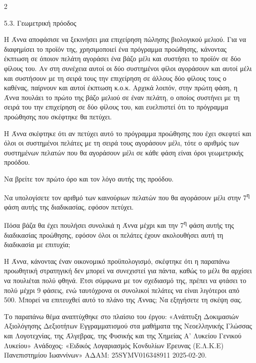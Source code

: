 \begin{ylh}{2}
    \item 5.3. Γεωμετρική πρόοδος
\end{ylh}
Η Άννα αποφάσισε να ξεκινήσει μια επιχείρηση πώλησης βιολογικού μελιού. Για να διαφημίσει το προϊόν της, χρησιμοποιεί ένα πρόγραμμα προώθησης, κάνοντας έκπτωση σε όποιον πελάτη αγοράσει ένα βάζο μέλι και συστήσει το προϊόν σε δύο φίλους του. Αν στη συνέχεια αυτοί οι δύο συστημένοι φίλοι αγοράσουν και αυτοί μέλι και συστήσουν με τη σειρά τους την επιχείρηση σε άλλους δύο φίλους τους ο καθένας, παίρνουν και αυτοί έκπτωση κ.ο.κ. Αρχικά λοιπόν, στην πρώτη φάση, η Άννα πουλάει το πρώτο της βάζο μελιού σε έναν πελάτη, ο οποίος συστήνει με τη σειρά του την επιχείρηση σε δύο φίλους του, και ευελπιστεί ότι το πρόγραμμα προώθησης που σκέφτηκε θα πετύχει.

\begin{alist}
\item Η Άννα σκέφτηκε ότι αν πετύχει αυτό το πρόγραμμα προώθησης που έχει σκεφτεί και όλοι οι συστημένοι πελάτες με τη σειρά τους αγοράσουν μέλι, τότε ο αριθμός των συστημένων πελατών που θα αγοράσουν μέλι σε κάθε φάση είναι όροι γεωμετρικής προόδου.

\begin{rlist}
\item
  Να βρείτε τον πρώτο όρο και τον λόγο αυτής της προόδου.

\item
  Να υπολογίσετε τον αριθμό των καινούριων πελατών που θα αγοράσουν μέλι στην 7\textsuperscript{η} φάση αυτής της διαδικασίας, εφόσον πετύχει.

\item
  Πόσα βάζα θα έχει πουλήσει συνολικά η Άννα μέχρι και την 7\textsuperscript{η} φάση αυτής της διαδικασίας προώθησης, εφόσον όλοι οι πελάτες έχουν ακολουθήσει αυτή τη διαδικασία με επιτυχία;
\end{rlist}
\item Η Άννα, κάνοντας έναν οικονομικό προϋπολογισμό, σκέφτηκε ότι η παραπάνω προωθητική στρατηγική δεν μπορεί να συνεχιστεί για πάντα, καθώς το μέλι θα αρχίσει να πουλιέται πολύ φθηνά. Έτσι σύμφωνα με τον σχεδιασμό της, πρέπει να φτάσει το πολύ μέχρι 9 φάσεις, ενώ ταυτόχρονα οι συνολικοί πελάτες να είναι λιγότεροι από 500. Μπορεί να επιτευχθεί αυτό το πλάνο της Άννας; Να εξηγήσετε τη σκέψη σας.
\end{alist}
{\footnotesize Το παραπάνω θέμα αναπτύχθηκε στο πλαίσιο του έργου: «Ανάπτυξη Δοκιμασιών Αξιολόγησης Δεξιοτήτων Εγγραμματισμού στα μαθήματα της Νεοελληνικής Γλώσσας και Λογοτεχνίας, της Άλγεβρας, της Φυσικής και της Χημείας Α' Λυκείου Γενικού Λυκείου» Ανάδοχος: «Ειδικός Λογαριασμός Κονδυλίων Έρευνας (Ε.Λ.Κ.Ε) Πανεπιστημίου Ιωαννίνων» ΑΔΑΜ: 25SYMV016348911 2025-02-20.}

